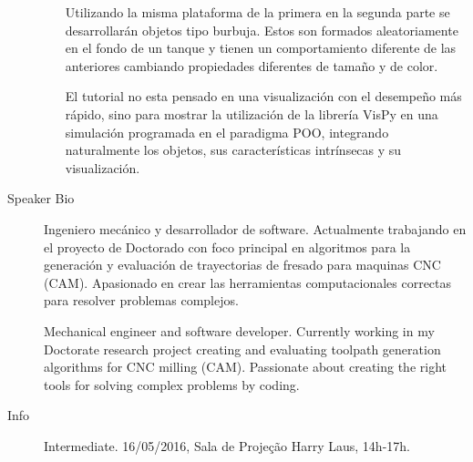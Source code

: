 \begin{description}
\begin{itemize}
    Utilizando la misma plataforma de la primera en la segunda parte se desarrollarán objetos tipo burbuja. Estos son formados aleatoriamente en el fondo de un tanque y tienen un comportamiento diferente de las anteriores cambiando propiedades diferentes de tamaño y de color.

El tutorial no esta pensado en una visualización con el desempeño más rápido, sino para mostrar la utilización de la librería VisPy en una simulación programada en el paradigma POO, integrando naturalmente los objetos, sus características intrínsecas y su visualización.
\end{itemize}
    \item[Speaker Bio] Ingeniero mecánico y desarrollador de software. Actualmente trabajando en el proyecto de Doctorado con foco principal en algoritmos para la generación y evaluación de trayectorias de fresado para maquinas CNC (CAM). Apasionado en crear las herramientas computacionales correctas para resolver problemas complejos.

Mechanical engineer and software developer. Currently working in my Doctorate research project creating and evaluating toolpath generation algorithms for CNC milling (CAM). Passionate about creating the right tools for solving complex problems by coding.
    \item[Info] Intermediate. 16/05/2016, Sala de Projeção Harry Laus, 14h-17h.
\end{description} 
